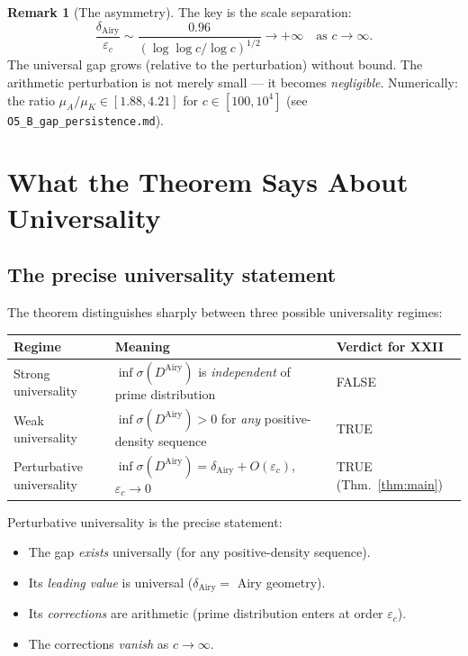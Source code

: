 \documentclass[12pt,a4paper]{amsart}
\theoremstyle{definition}
\newtheorem{remark}[theorem]{Remark}
\newcommand{\DAi}{D^{\mathrm{Airy}}}
\begin{document}
\begin{remark}[The asymmetry]
The key is the scale separation:
\[
  \frac{\delta_{\mathrm{Airy}}}{\varepsilon_c}
  \sim \frac{0.96}{(\log\log c/\log c)^{1/2}}
  \to +\infty \quad\text{as } c \to \infty.
\]
The universal gap grows (relative to the perturbation) without bound.
The arithmetic perturbation is not merely small --- it becomes \emph{negligible}.
Numerically: the ratio $\mu_A/\mu_K \in [1.88, 4.21]$ for $c \in [100, 10^4]$
(see \texttt{O5\_B\_gap\_persistence.md}).
\end{remark}

\section{What the Theorem Says About Universality}
\label{sec:universality}

\subsection{The precise universality statement}

The theorem distinguishes sharply between three possible universality regimes:

\begin{center}
\begin{tabular}{lll}
\toprule
Regime & Meaning & Verdict for XXII\\
\midrule
Strong universality & $\inf\sigma(\DAi)$ is \emph{independent} of prime distribution & FALSE\\
Weak universality & $\inf\sigma(\DAi) > 0$ for \emph{any} positive-density sequence & TRUE\\
Perturbative universality & $\inf\sigma(\DAi) = \delta_{\mathrm{Airy}} + O(\varepsilon_c)$,
  $\varepsilon_c \to 0$ & TRUE (Thm.~\ref{thm:main})\\
\bottomrule
\end{tabular}
\end{center}

\medskip

Perturbative universality is the precise statement:
\begin{itemize}
  \item The gap \emph{exists} universally (for any positive-density sequence).
  \item Its \emph{leading value} is universal ($\delta_{\mathrm{Airy}} = $ Airy geometry).
  \item Its \emph{corrections} are arithmetic (prime distribution enters at order $\varepsilon_c$).
  \item The corrections \emph{vanish} as $c \to \infty$.
\end{itemize}
\end{document}

